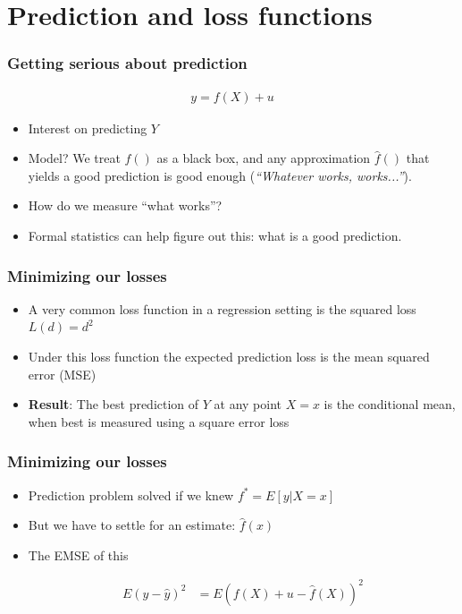 \documentclass[
  shownotes,
  xcolor={svgnames},
  hyperref={colorlinks,citecolor=DarkBlue,linkcolor=andesred,urlcolor=DarkBlue}
  , aspectratio=169]{beamer}
\begin{document}
\section{Prediction and loss functions}
\begin{frame}
\frametitle{Getting serious about prediction}


\begin{align}
y=f(X)+u
\end{align}

\begin{itemize}
  \item Interest on predicting $Y$
  \medskip
  \item Model? We  treat $f()$ as a black box, and any approximation $\hat{f}()$ that yields a good prediction is good enough ({\it ``Whatever works, works...''}).
  \medskip
  \item How do we measure ``what works''?
  \pause
  \medskip
  \item Formal statistics can help  figure out this: what is a good prediction.

\end{itemize}


\end{frame}
\begin{frame}
\frametitle{Minimizing our losses}
\begin{itemize}
\item A very common loss function in a regression setting is the squared loss $L(d)=d^2$
\medskip
\item Under this loss function the expected prediction loss  is the mean squared error (MSE)
\medskip
  

\item {\bf Result}: The best prediction of $Y$ at any point $X = x$ is the conditional mean, when best is measured using a square error loss
\end{itemize}


\end{frame}
\begin{frame}
\frametitle{Minimizing our losses}

\begin{itemize}
\item Prediction problem solved if we knew $f^* = E[y|X=x]$ 
\pause
\medskip
\item But we have to settle for an estimate: $\hat{f}(x)$
\medskip
\item The EMSE of this

\begin{align}
E(y-\hat y)^2 &= E(f(X)+u - \hat f(X))^2 
\end{align}
\end{itemize}

\end{frame}
\end{document}
